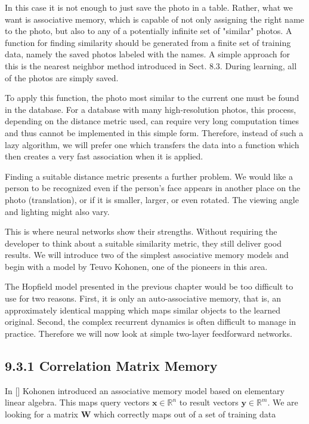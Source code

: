 \documentclass[10pt]{article}
\begin{document}
In this case it is not enough to just save the photo in a table. Rather, what we want is associative memory, which is capable of not only assigning the right name to the photo, but also to any of a potentially infinite set of "similar" photos. A function for finding similarity should be generated from a finite set of training data, namely the saved photos labeled with the names. A simple approach for this is the nearest neighbor method introduced in Sect. 8.3. During learning, all of the photos are simply saved.

To apply this function, the photo most similar to the current one must be found in the database. For a database with many high-resolution photos, this process, depending on the distance metric used, can require very long computation times and thus cannot be implemented in this simple form. Therefore, instead of such a lazy algorithm, we will prefer one which transfers the data into a function which then creates a very fast association when it is applied.


Finding a suitable distance metric presents a further problem. We would like a person to be recognized even if the person's face appears in another place on the photo (translation), or if it is smaller, larger, or even rotated. The viewing angle and lighting might also vary.

This is where neural networks show their strengths. Without requiring the developer to think about a suitable similarity metric, they still deliver good results. We will introduce two of the simplest associative memory models and begin with a model by Teuvo Kohonen, one of the pioneers in this area.

The Hopfield model presented in the previous chapter would be too difficult to use for two reasons. First, it is only an auto-associative memory, that is, an approximately identical mapping which maps similar objects to the learned original. Second, the complex recurrent dynamics is often difficult to manage in practice. Therefore we will now look at simple two-layer feedforward networks.

\subsection*{9.3.1 Correlation Matrix Memory}
In [\cite{kohonen1972correlation}] Kohonen introduced an associative memory model based on elementary linear algebra. This maps query vectors $\boldsymbol{x} \in \mathbb{R}^{n}$ to result vectors $\boldsymbol{y} \in \mathbb{R}^{m}$. We are looking for a matrix $\boldsymbol{W}$ which correctly maps out of a set of training data
\end{document}

